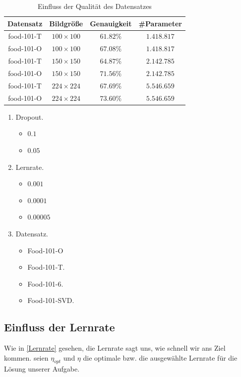 \documentclass[12pt,a4paper]{scrartcl}
\numberwithin{equation}{section}
\begin{document}
\begin{table}[ht]
	\centering
	\begin{tabular}{*{4}{|c}| }
		\hline
		Datensatz & Bildgröße & Genauigkeit & \#Parameter \\ \hline
		food-101-T&$ 100\times100 $&$ 61.82\% $ &$ 1.418.817 $ \\ \hline
		food-101-O&$ 100\times100 $&$ 67.08\% $ &$ 1.418.817 $  \\ \hline
		
		food-101-T&$ 150\times150 $&$ 64.87\% $ &$ 2.142.785 $  \\ \hline
		food-101-O&$ 150\times150 $&$ 71.56\% $ &$ 2.142.785 $  \\ \hline
		
		food-101-T&$ 224\times224 $&$ 67.69\% $ &$  5.546.659 $  \\ \hline
		food-101-O&$ 224\times224 $&$ 73.60\% $ &$ 5.546.659 $  \\ \hline
		\hline
	\end{tabular}
	\caption{Einfluss der Qualität des Datensatzes }
	\label{tab:Bildqualitaet}
\end{table}
\begin{enumerate}
	\item Dropout.
		\begin{itemize}
			\item $ 0.1 $
			\item $ 0.05 $
		\end{itemize}
	\item Lernrate.
		\begin{itemize}
			\item $ 0.001 $
			\item $ 0.0001 $
			\item $ 0.00005 $
		\end{itemize}
	\item Datensatz.
		\begin{itemize}
			\item Food-101-O
			\item Food-101-T.
			\item Food-101-6.
			\item Food-101-SVD. 
		\end{itemize}

\end{enumerate}

\subsection{ Einfluss der Lernrate}\label{Experiment:Lernrate}
Wie in \ref{Lernrate} gesehen, die Lernrate sagt uns, wie schnell wir ans Ziel kommen.
seien $ \eta_{opt} $  und $ \eta $ die optimale bzw. die ausgewählte Lernrate für die Lösung unserer Aufgabe.
\end{document}
